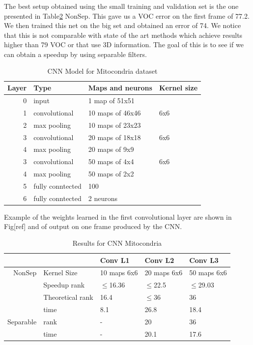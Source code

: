 The best setup obtained using the small training and validation set is the one presented in Table\ref{fig:CNN3} NonSep. This gave us a VOC error on the first frame of 77.2. We then trained this net on the big set and obtained an error of 74. We notice that this is not comparable with state of the art methods which achieve results higher than 79 VOC or that use 3D information. The goal of this
is to see if we can obtain a speedup by using separable filters.
\begin{table}
\centering
\begin{tabular}{@{}rlll@{}}\toprule
Layer & Type & Maps and neurons& Kernel size \\ \midrule
0 & input & 1 map of 51x51 &\\
1& convolutional & 10 maps of 46x46 & 6x6\\
2 & max pooling & 10 maps of 23x23 &  \\
3 & convolutional & 20 maps of 18x18& 6x6 \\
4 & max pooling & 20 maps of 9x9& \\ 
3 & convolutional & 50 maps of 4x4& 6x6 \\
4 & max pooling & 50 maps of 2x2& \\ 
5 & fully conntected& 100 & \\
6 & fully conntected & 2 neurons & \\ \bottomrule
\end{tabular}
\caption{CNN Model for Mitocondria dataset}
\label{fig:CNN3}
\end{table}
Example of the weights learned in the first convolutional layer are shown in Fig[ref] and of output on one frame produced by the CNN. 
\begin{table}
\centering
\begin{tabular}{@{}rllll@{}}\toprule
 &&Conv L1& Conv L2 & Conv L3\\ \midrule
NonSep &Kernel Size & 10 maps 6x6& 20 maps 6x6 & 50 maps 6x6\\
&Speedup rank& $\leq$16.36 & $\leq$22.5 & $\leq$29.03\\
&Theoretical rank & 16.4 & $\leq$36 & 36 \\ 
&time & 8.1 & 26.8 & 18.4 \\ \midrule
Separable& rank & - & 20 & 36 \\ 
& time& - & 20.1 & 17.6\\ \midrule
\end{tabular}
\caption{Results for CNN Mitocondria}
\label{fig:CNN3}
\end{table}

